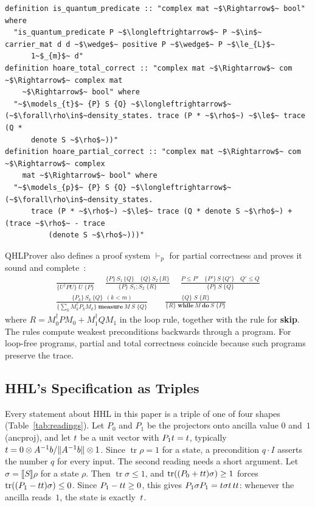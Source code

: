 \documentclass[runningheads]{llncs}
\DeclareMathOperator{\Tr}{tr}
\let\ket\relax\let\bra\relax\let\braket\relax\let\ketbra\relax
\newcommand{\ket}[1]{|#1\rangle}
\newcommand{\bra}[1]{\langle #1|}
\newcommand{\braket}[2]{\langle #1|#2\rangle}
\newcommand{\ketbra}[2]{|#1\rangle\langle #2|}
\newcommand{\norm}[1]{\|#1\|}
\DeclareRobustCommand{\isa}[1]{\textsf{\def\_{\char95\allowbreak}#1}}
\newcommand{\sem}[1]{\llbracket #1\rrbracket}
\begin{document}
\noindent\begin{minipage}{\linewidth}
\begin{lstlisting}[caption={Quantum predicates and triples in QHLProver (inside the locale
\isa{state\_sig}, where \isa{d} is the dimension of the state space; syntax annotations
omitted)},label={lst:triples}]
definition is_quantum_predicate :: "complex mat ~$\Rightarrow$~ bool" where
  "is_quantum_predicate P ~$\longleftrightarrow$~ P ~$\in$~ carrier_mat d d ~$\wedge$~ positive P ~$\wedge$~ P ~$\le_{L}$~
      1~$_{m}$~ d"
definition hoare_total_correct :: "complex mat ~$\Rightarrow$~ com ~$\Rightarrow$~ complex mat
    ~$\Rightarrow$~ bool" where
  "~$\models_{t}$~ {P} S {Q} ~$\longleftrightarrow$~ (~$\forall\rho\in$~density_states. trace (P * ~$\rho$~) ~$\le$~ trace (Q *
      denote S ~$\rho$~))"
definition hoare_partial_correct :: "complex mat ~$\Rightarrow$~ com ~$\Rightarrow$~ complex
    mat ~$\Rightarrow$~ bool" where
  "~$\models_{p}$~ {P} S {Q} ~$\longleftrightarrow$~ (~$\forall\rho\in$~density_states.
      trace (P * ~$\rho$~) ~$\le$~ trace (Q * denote S ~$\rho$~) + (trace ~$\rho$~ - trace
          (denote S ~$\rho$~)))"
\end{lstlisting}
\end{minipage}

QHLProver also defines a proof system $\vdash_p$ for partial correctness and proves it sound and
complete~\cite{liu2019qhl}:
\begin{gather*}
\frac{}{\{U^\dagger PU\}\;U\;\{P\}}\quad\
\frac{\{P\}\,S_1\,\{Q\}\quad\{Q\}\,S_2\,\{R\}}{\{P\}\;S_1;S_2\;\{R\}}\quad\
\frac{P\le P'\quad\{P'\}\,S\,\{Q'\}\quad Q'\le Q}{\{P\}\;S\;\{Q\}}\\[0.5em]
\frac{\{P_k\}\,S_k\,\{Q\}\ \ (k<m)}{\{\sum_kM_k^\dagger P_kM_k\}\;\mathbf{measure}\ M\ \bar S\;\{Q\}}\qquad
\frac{\{Q\}\;S\;\{R\}}{\{R\}\;\mathbf{while}\ M\ \mathbf{do}\ S\;\{P\}}
\end{gather*}
where $R=M_0^\dagger PM_0+M_1^\dagger QM_1$ in the loop rule,
together with the rule for \textbf{skip}. The rules compute weakest preconditions backwards through
a program. For loop-free programs, partial and total correctness coincide because such programs
preserve the trace.

\subsection{HHL's Specification as Triples}

Every statement about HHL in this paper is a triple of one of four shapes
(Table~\ref{tab:readings}). Let $P_0$ and $P_1$ be the projectors onto ancilla value $0$ and~$1$
(\isa{anc\_proj}), and let $\ket t$ be a unit vector with $P_1\ket t=\ket t$, typically
$\ket t=\ket0\otimes A^{-1}b/\norm{A^{-1}b}\otimes\ket1$. Since $\Tr\rho=1$ for a state, a precondition
$q\cdot I$ asserts the number $q$ for every input. The second reading needs a short argument. Let
$\sigma=\sem S\rho$ for a state $\rho$. Then $\Tr\sigma\le1$, and $\Tr((P_0+\ketbra tt)\sigma)\ge1$
forces $\Tr((P_1-\ketbra tt)\sigma)\le0$. Since $P_1-\ketbra tt\ge0$, this gives
$P_1\sigma P_1=\bra t\sigma\ket t\,\ketbra tt$: whenever the ancilla reads~$1$, the state is
exactly~$\ket t$.
\end{document}
